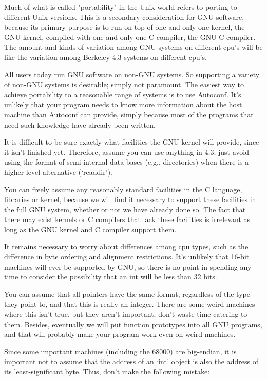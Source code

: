    Much of what is called "portability" in the Unix world refers to
porting to different Unix versions.  This is a secondary consideration
for GNU software, because its primary purpose is to run on top of one
and only one kernel, the GNU kernel, compiled with one and only one C
compiler, the GNU C compiler.  The amount and kinds of variation among
GNU systems on different cpu's will be like the variation among Berkeley
4.3 systems on different cpu's.

   All users today run GNU software on non-GNU systems.  So supporting a
variety of non-GNU systems is desirable; simply not paramount.  The
easiest way to achieve portability to a reasonable range of systems is
to use Autoconf.  It's unlikely that your program needs to know more
information about the host machine than Autoconf can provide, simply
because most of the programs that need such knowledge have already been
written.

   It is difficult to be sure exactly what facilities the GNU kernel
will provide, since it isn't finished yet.  Therefore, assume you can
use anything in 4.3; just avoid using the format of semi-internal data
bases (e.g., directories) when there is a higher-level alternative
(`readdir').

   You can freely assume any reasonably standard facilities in the C
language, libraries or kernel, because we will find it necessary to
support these facilities in the full GNU system, whether or not we have
already done so.  The fact that there may exist kernels or C compilers
that lack these facilities is irrelevant as long as the GNU kernel and
C compiler support them.

   It remains necessary to worry about differences among cpu types, such
as the difference in byte ordering and alignment restrictions.  It's
unlikely that 16-bit machines will ever be supported by GNU, so there
is no point in spending any time to consider the possibility that an
int will be less than 32 bits.

   You can assume that all pointers have the same format, regardless of
the type they point to, and that this is really an integer.  There are
some weird machines where this isn't true, but they aren't important;
don't waste time catering to them.  Besides, eventually we will put
function prototypes into all GNU programs, and that will probably make
your program work even on weird machines.

   Since some important machines (including the 68000) are big-endian,
it is important not to assume that the address of an `int' object is
also the address of its least-significant byte.  Thus, don't make the
following mistake:

